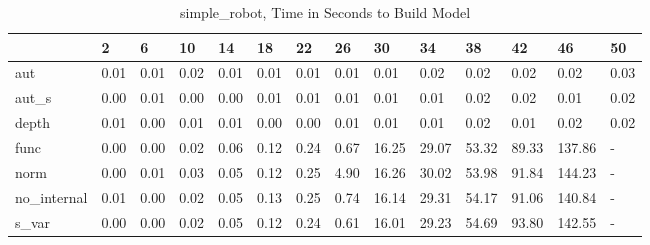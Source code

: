 \begin{table}
\caption{simple_robot, Time in Seconds to Build Model}
\label{simple_robot_model_time}
\begin{tabular}{llllllllllllll}
\toprule
 & 2 & 6 & 10 & 14 & 18 & 22 & 26 & 30 & 34 & 38 & 42 & 46 & 50 \\
\midrule
aut & 0.01 & 0.01 & 0.02 & 0.01 & 0.01 & 0.01 & 0.01 & 0.01 & 0.02 & 0.02 & 0.02 & 0.02 & 0.03 \\
aut_s & 0.00 & 0.01 & 0.00 & 0.00 & 0.01 & 0.01 & 0.01 & 0.01 & 0.01 & 0.02 & 0.02 & 0.01 & 0.02 \\
depth & 0.01 & 0.00 & 0.01 & 0.01 & 0.00 & 0.00 & 0.01 & 0.01 & 0.01 & 0.02 & 0.01 & 0.02 & 0.02 \\
func & 0.00 & 0.00 & 0.02 & 0.06 & 0.12 & 0.24 & 0.67 & 16.25 & 29.07 & 53.32 & 89.33 & 137.86 & - \\
norm & 0.00 & 0.01 & 0.03 & 0.05 & 0.12 & 0.25 & 4.90 & 16.26 & 30.02 & 53.98 & 91.84 & 144.23 & - \\
no_internal & 0.01 & 0.00 & 0.02 & 0.05 & 0.13 & 0.25 & 0.74 & 16.14 & 29.31 & 54.17 & 91.06 & 140.84 & - \\
s_var & 0.00 & 0.00 & 0.02 & 0.05 & 0.12 & 0.24 & 0.61 & 16.01 & 29.23 & 54.69 & 93.80 & 142.55 & - \\
\bottomrule
\end{tabular}
\end{table}
